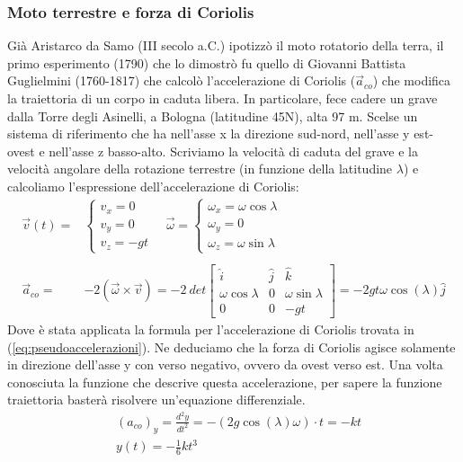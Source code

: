 \subsubsection*{Moto terrestre e forza di Coriolis}
Già Aristarco da Samo (III secolo a.C.) ipotizzò il moto rotatorio della  terra, il primo esperimento (1790) che lo dimostrò fu quello di Giovanni Battista Guglielmini (1760-1817) che calcolò l'accelerazione di Coriolis ($\vec{a}_{co}$) che modifica la traiettoria di un corpo in caduta libera. In particolare, fece cadere un grave dalla Torre degli Asinelli, a Bologna (latitudine 45\textdegree N), alta 97 m. Scelse un sistema di riferimento che ha nell'asse x la direzione sud-nord, nell'asse y est-ovest e nell'asse z basso-alto. Scriviamo la velocità di caduta del grave e la velocità angolare della rotazione terrestre (in funzione della latitudine $\lambda$) e calcoliamo l'espressione dell'accelerazione di Coriolis:
\begin{align*}
\vec{v} (t)=&
\begin{cases}
	v_x = 0\\
	v_y = 0\\
	v_z = -gt
\end{cases} \quad 
\vec{\omega} = 
\begin{cases}
	\omega_x=\omega\cos \lambda\\
	\omega_y=0\\
	\omega_z=\omega\sin\lambda
\end{cases}\\\\
\vec{a}_{co} =& -2(\vec{\omega} \times \vec{v}) =
 -2\ det\begin{bmatrix}
	\hat{i}           & \hat{j} & \hat{k}\\
	\omega\cos\lambda & 0       &\omega\sin\lambda\\
	0                 & 0       & -gt 
\end{bmatrix}
= -2gt\omega\cos(\lambda) \hat{j}
\end{align*}
Dove è stata applicata la formula per l'accelerazione di Coriolis trovata in (\ref{eq:pseudoaccelerazioni}). Ne deduciamo che la forza di Coriolis agisce solamente in direzione dell'asse y con verso negativo, ovvero da ovest verso est. Una volta conosciuta la funzione che descrive questa accelerazione, per sapere la funzione traiettoria basterà risolvere un'equazione differenziale.
\begin{align*}
	&(a_{co})_y= \frac{d^2y}{dt^2} = -(2g\cos(\lambda)\omega)\cdot t = -kt\\
	&y(t) = -\frac{1}{6}kt^3
\end{align*}
